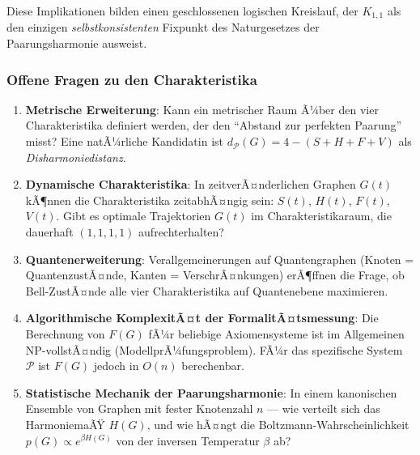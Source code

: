 ﻿\documentclass[a4paper,12pt]{article}
\theoremstyle{definition}
\begin{document}
Diese Implikationen bilden einen geschlossenen logischen Kreislauf, der $K_{1,1}$
als den einzigen \emph{selbstkonsistenten} Fixpunkt des Naturgesetzes der Paarungsharmonie
ausweist.

\subsubsection*{Offene Fragen zu den Charakteristika}

\begin{enumerate}
	\item \textbf{Metrische Erweiterung}: Kann ein metrischer Raum Ã¼ber den vier
	Charakteristika definiert werden, der den \enquote{Abstand zur perfekten Paarung}
	misst? Eine natÃ¼rliche Kandidatin ist $d_{\mathcal{P}}(G) = 4 - (S + H + F + V)$
	als \emph{Disharmoniedistanz}.
	
	\item \textbf{Dynamische Charakteristika}: In zeitverÃ¤nderlichen Graphen $G(t)$
	kÃ¶nnen die Charakteristika zeitabhÃ¤ngig sein: $S(t)$, $H(t)$, $F(t)$, $V(t)$.
	Gibt es optimale Trajektorien $G(t)$ im Charakteristikaraum, die dauerhaft
	$(1,1,1,1)$ aufrechterhalten?
	
	\item \textbf{Quantenerweiterung}: Verallgemeinerungen auf Quantengraphen
	(Knoten = QuantenzustÃ¤nde, Kanten = VerschrÃ¤nkungen) erÃ¶ffnen die Frage, ob
	Bell-ZustÃ¤nde alle vier Charakteristika auf Quantenebene maximieren.
	
	\item \textbf{Algorithmische KomplexitÃ¤t der FormalitÃ¤tsmessung}: Die Berechnung
	von $F(G)$ fÃ¼r beliebige Axiomensysteme ist im Allgemeinen NP-vollstÃ¤ndig
	(ModellprÃ¼fungsproblem). FÃ¼r das spezifische System $\mathcal{P}$ ist $F(G)$
	jedoch in $O(n)$ berechenbar.
	
	\item \textbf{Statistische Mechanik der Paarungsharmonie}: In einem kanonischen
	Ensemble von Graphen mit fester Knotenzahl $n$ --- wie verteilt sich das
	HarmoniemaÃŸ $H(G)$, und wie hÃ¤ngt die Boltzmann-Wahrscheinlichkeit
	$p(G) \propto e^{\beta H(G)}$ von der inversen Temperatur $\beta$ ab?
\end{enumerate}
\end{document}
